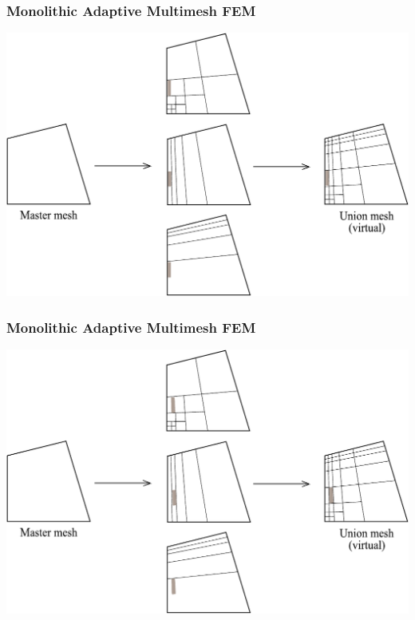 \begin{frame}
  \frametitle{Monolithic Adaptive Multimesh FEM}
  \begin{center}
    \includegraphics[height=0.7\textheight]{multimesh/mm_10.pdf}
  \end{center}
\end{frame}

\begin{frame}
  \frametitle{Monolithic Adaptive Multimesh FEM}
  \begin{center}
    \includegraphics[height=0.7\textheight]{multimesh/mm_11.pdf}
  \end{center}
\end{frame}

